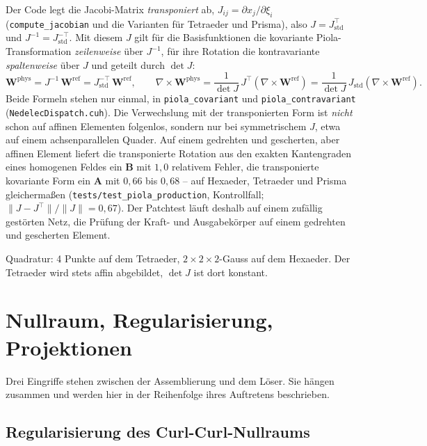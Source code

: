 \documentclass[11pt,a4paper]{article}
\begin{document}
Der Code legt die Jacobi-Matrix \emph{transponiert} ab,
$J_{ij} = \partial x_j/\partial\xi_i$ (\texttt{compute\_jacobian} und die
Varianten für Tetraeder und Prisma), also $J = J_{\text{std}}^{\top}$ und
$J^{-1} = J_{\text{std}}^{-\top}$. Mit diesem $J$ gilt für die
Basisfunktionen die kovariante Piola-Transformation \emph{zeilenweise} über
$J^{-1}$, für ihre Rotation die kontravariante \emph{spaltenweise} über $J$
und geteilt durch $\det J$:
\begin{equation}
  \mathbf{W}^{\text{phys}} = J^{-1}\,\mathbf{W}^{\text{ref}}
  = J_{\text{std}}^{-\top}\,\mathbf{W}^{\text{ref}},
  \qquad
  \nabla\times\mathbf{W}^{\text{phys}}
  = \frac{1}{\det J}\,J^{\top}\left(\nabla\times\mathbf{W}^{\text{ref}}\right)
  = \frac{1}{\det J}\,J_{\text{std}}\left(\nabla\times\mathbf{W}^{\text{ref}}\right).
\end{equation}
Beide Formeln stehen nur einmal, in \texttt{piola\_covariant} und
\texttt{piola\_contravariant} (\texttt{NedelecDispatch.cuh}). Die Verwechslung
mit der transponierten Form ist \emph{nicht} schon auf affinen Elementen
folgenlos, sondern nur bei symmetrischem $J$, etwa auf einem achsenparallelen
Quader. Auf einem gedrehten und gescherten, aber affinen Element liefert die
transponierte Rotation aus den exakten Kantengraden eines homogenen Feldes
ein $\mathbf{B}$ mit $1{,}0$ relativem Fehler, die transponierte kovariante
Form ein $\mathbf{A}$ mit $0{,}66$ bis $0{,}68$ -- auf Hexaeder, Tetraeder
und Prisma gleichermaßen (\texttt{tests/test\_piola\_production},
Kontrollfall; $\|J - J^{\top}\|/\|J\| = 0{,}67$). Der Patchtest läuft deshalb
auf einem zufällig gestörten Netz, die Prüfung der Kraft- und Ausgabekörper
auf einem gedrehten und gescherten Element.

Quadratur: 4 Punkte auf dem Tetraeder, $2\times2\times2$-Gauss auf dem
Hexaeder. Der Tetraeder wird stets affin abgebildet, $\det J$ ist dort
konstant.

\section{Nullraum, Regularisierung, Projektionen}
\label{sec:regul}

Drei Eingriffe stehen zwischen der Assemblierung und dem Löser. Sie hängen
zusammen und werden hier in der Reihenfolge ihres Auftretens beschrieben.

\subsection{Regularisierung des Curl-Curl-Nullraums}
\end{document}
